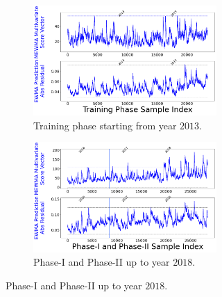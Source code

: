 \documentclass[twoside,11pt]{article}
\begin{document}
\begin{figure}[!htbp]
\begin{subfigure}[t]{0.48\linewidth}
     \centering
     \begin{subfigure}[t]{\linewidth}
     \centering
        \includegraphics[width=\textwidth, trim=.0in .0in .0in .0in, clip]{../figures/v14/bike_sharing/reg_lin_cat_syr_13_tr_5_new/train_bike_reg_1e-08_0_0001_0_01_99_99.png}
        \caption{Training phase starting from year $2013$.}
        \label{fig:bs_tr_2013}
     \end{subfigure}
     \begin{subfigure}[t]{\linewidth}
     \centering
        \includegraphics[width=\textwidth, trim=.0in .0in .0in .0in, clip]{../figures/v14/bike_sharing/reg_lin_cat_syr_13_tr_5_new/bike_reg_1e-08_0_0001_0_01_99_99.png}
        \caption{Phase-I and Phase-II up to year $2018$.}
        \label{fig:bs_PIPII_tr_2013}
     \end{subfigure}
\end{subfigure}
\caption{
}
\end{figure}
\end{document}
